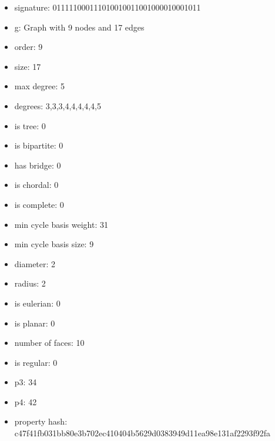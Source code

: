 \newpage
\begin{figure}
\end{figure}
\begin{itemize}
\item signature: 011111000111010010011001000010001011
\item g: Graph with 9 nodes and 17 edges
\item order: 9
\item size: 17
\item max degree: 5
\item degrees: 3,3,3,4,4,4,4,4,5
\item is tree: 0
\item is bipartite: 0
\item has bridge: 0
\item is chordal: 0
\item is complete: 0
\item min cycle basis weight: 31
\item min cycle basis size: 9
\item diameter: 2
\item radius: 2
\item is eulerian: 0
\item is planar: 0
\item number of faces: 10
\item is regular: 0
\item p3: 34
\item p4: 42
\item property hash: c47f41fb031bb80e3b702ec410404b5629d0383949d11ea98e131af2293f92fa
\end{itemize}
